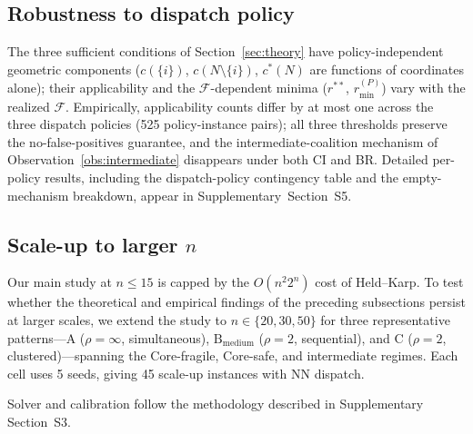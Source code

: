 \documentclass[11pt]{article}
\theoremstyle{plain}
\theoremstyle{definition}
\theoremstyle{remark}
\newcommand{\F}{\mathcal{F}}
\newcommand{\cstar}{c^{\ast}}
\begin{document}
\subsection{Robustness to dispatch policy}
\label{ssec:policy}

The three sufficient conditions of Section~\ref{sec:theory} have policy-independent geometric components ($c(\{i\})$, $c(N\setminus\{i\})$, $\cstar(N)$ are functions of coordinates alone); their applicability and the $\F$-dependent minima ($r^{\ast\ast}$, $r^{(P)}_{\min}$) vary with the realized $\F$. Empirically, applicability counts differ by at most one across the three dispatch policies (525 policy-instance pairs); all three thresholds preserve the no-false-positives guarantee, and the intermediate-coalition mechanism of Observation~\ref{obs:intermediate} disappears under both CI and BR. Detailed per-policy results, including the dispatch-policy contingency table and the empty-mechanism breakdown, appear in Supplementary~Section~S5.

\subsection{Scale-up to larger \texorpdfstring{$n$}{n}}
\label{ssec:scaleup}

Our main study at $n\le 15$ is capped by the $O(n^2 2^n)$ cost of Held--Karp. To test whether the theoretical and empirical findings of the preceding subsections persist at larger scales, we extend the study to $n\in\{20,30,50\}$ for three representative patterns---A ($\rho=\infty$, simultaneous), $\text{B}_{\text{medium}}$ ($\rho=2$, sequential), and C ($\rho=2$, clustered)---spanning the Core-fragile, Core-safe, and intermediate regimes. Each cell uses 5 seeds, giving 45 scale-up instances with NN dispatch.

Solver and calibration follow the methodology described in Supplementary Section~S3.
\end{document}
